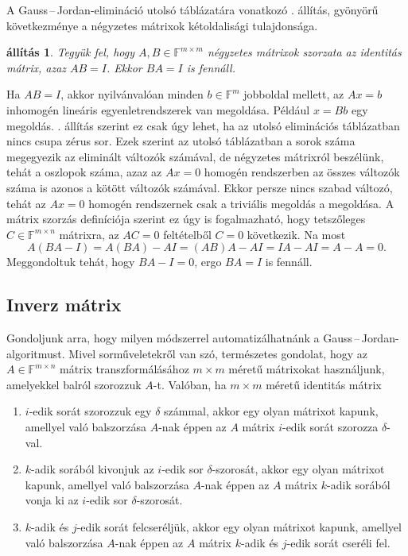 \documentclass[a4paper, showtrims]{memoir}
\makeatletter
\renewenvironment{proof}[1][\proofname]
    {\par\pushQED{\qed}%
    \normalfont \topsep6\p@\@plus6\p@\relax
    \trivlist
    \item[\hskip\labelsep
        \itshape
    #1\@addpunct{:}]\ignorespaces}
    {\popQED\endtrivlist\@endpefalse}
\theoremstyle{plain}
\newtheorem{proposition}{állítás}[chapter]
\theoremstyle{remark}
\theoremstyle{definition}
\makeatother
\begin{document}
A Gauss\,--\,Jordan-elimináció utolsó táblázatára vonatkozó . állítás, gyönyörű
következménye a négyzetes mátrixok kétoldalisági tulajdonsága.
\begin{proposition}
    Tegyük fel, hogy $A,B\in\mathbb{F}^{m\times m}$ négyzetes mátrixok szorzata az identitás mátrix,
    azaz $AB=I$.
    Ekkor $BA=I$ is fennáll.
    \label{pr:ketoldal}
\end{proposition}
\begin{proof}
    Ha $AB=I$, akkor nyilvánvalóan minden $b\in\mathbb{F}^m$ jobboldal mellett,
    az $Ax=b$ inhomogén lineáris egyenletrendszerek van megoldása. 
    Például $x=Bb$ egy megoldás.
    . állítás szerint ez csak úgy lehet, ha az utolsó eliminációs táblázatban nincs csupa zérus sor.
    Ezek szerint az utolsó táblázatban a sorok száma megegyezik az eliminált változók számával,
    de négyzetes mátrixról beszélünk, tehát a oszlopok száma, azaz az $Ax=0$ homogén rendszerben
    az összes változók száma is azonos a kötött változók számával.
    Ekkor persze nincs szabad változó, tehát az $Ax=0$ homogén rendszernek csak a triviális megoldás a megoldása.
    A mátrix szorzás definíciója szerint ez úgy is fogalmazható, hogy
    tetszőleges $C\in\mathbb{F}^{m\times n}$ mátrixra, az $AC=0$ feltételből $C=0$ következik.
    Na most
    \[
        A\left(BA-I  \right)=A\left( BA \right)-AI=\left( AB \right)A-AI=IA-AI=A-A=0.
    \]
    Meggondoltuk tehát, hogy $BA-I=0$, ergo $BA=I$ is fennáll.
\end{proof}
\subsection{Inverz mátrix}
Gondoljunk arra, hogy milyen módszerrel automatizálhatnánk a Gauss\,--\,Jordan-algoritmust.
Mivel sorműveletekről van szó, természetes gondolat, hogy az $A\in\mathbb{F}^{m\times n}$
mátrix transzformálásához $m\times m$ méretű mátrixokat használjunk,
amelyekkel balról szorozzuk $A$-t.
Valóban, ha $m\times m$ méretű identitás mátrix
\begin{enumerate}
	\item
	      $i$-edik sorát szorozzuk egy $\delta$ számmal,
	      akkor egy olyan mátrixot kapunk,
	      amellyel való balszorzása $A$-nak éppen az $A$ mátrix
	      $i$-edik sorát szorozza $\delta$-val.
	\item
	      $k$-adik sorából kivonjuk az $i$-edik sor $\delta$-szorosát,
	      akkor egy olyan mátrixot kapunk,
	      amellyel való balszorzása $A$-nak éppen az $A$ mátrix
	      $k$-adik sorából vonja ki az $i$-edik sor $\delta$-szorosát.
	\item
	      $k$-adik és $j$-edik sorát felcseréljük,
	      akkor egy olyan mátrixot kapunk,
	      amellyel való balszorzása $A$-nak éppen az $A$ mátrix
	      $k$-adik és $j$-edik sorát cseréli fel.
\end{enumerate}
\end{document}

